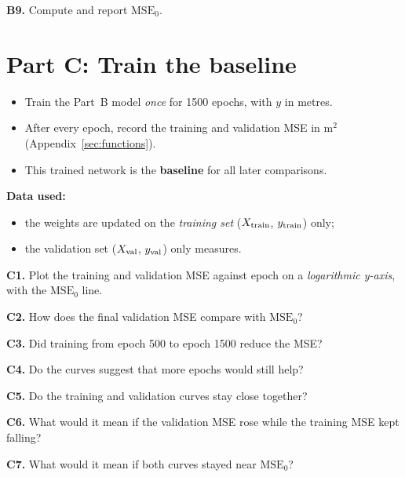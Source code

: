 \documentclass[11pt]{article}
\newcommand{\question}[2]{\par\noindent\textbf{#1.} #2\par}
\newcommand{\datause}[1]{\par\smallskip\needspace{4\baselineskip}\noindent\textbf{Data used:}\nopagebreak\begin{itemize}#1\end{itemize}}
\begin{document}
\question{B9}{Compute and report $\mathrm{MSE}_0$.}

\section*{Part C: Train the baseline}
\begin{itemize}
  \item \aitrap Train the Part~B model \emph{once} for 1500 epochs, with $y$ in metres.
  \item After every epoch, record the training and validation MSE in m$^2$ (Appendix~\ref{sec:functions}).
  \item This trained network is the \textbf{baseline} for all later comparisons.
\end{itemize}
\datause{
  \item the weights are updated on the \emph{training set} ($X_{\rm train}$, $y_{\rm train}$) only;
  \item the validation set ($X_{\rm val}$, $y_{\rm val}$) only measures.}

\question{C1}{Plot the training and validation MSE against epoch on a \emph{logarithmic y-axis}, with the $\mathrm{MSE}_0$ line.}
\question{C2}{How does the final validation MSE compare with $\mathrm{MSE}_0$?}
\question{C3}{Did training from epoch 500 to epoch 1500 reduce the MSE?}
\question{C4}{Do the curves suggest that more epochs would still help?}
\question{C5}{Do the training and validation curves stay close together?}
\question{C6}{What would it mean if the validation MSE rose while the training MSE kept falling?}
\question{C7}{What would it mean if both curves stayed near $\mathrm{MSE}_0$?}
\end{document}
